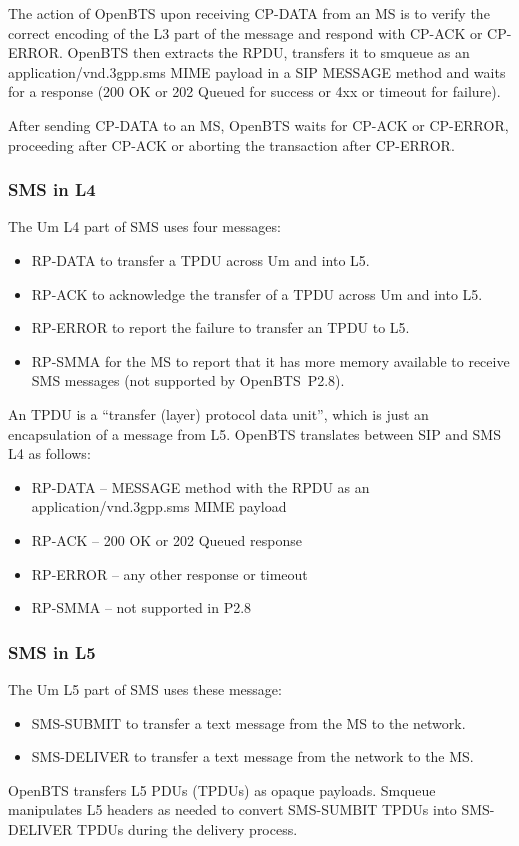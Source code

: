 \documentclass[11pt,openany]{book}
\begin{document}
The action of OpenBTS upon receiving CP-DATA from an MS is to verify the correct encoding of the L3 part of the message and respond with CP-ACK or CP-ERROR.
OpenBTS then extracts the RPDU, transfers it to smqueue as an application/vnd.3gpp.sms MIME payload in a SIP MESSAGE method and waits for a response (200 OK or 202 Queued for success or 4xx or timeout for failure).

After sending CP-DATA to an MS, OpenBTS waits for CP-ACK or CP-ERROR, proceeding after CP-ACK or aborting the transaction after CP-ERROR.

\subsubsection{SMS in L4}
The Um L4 part of SMS uses four messages:
\begin{itemize}
	\item RP-DATA to transfer a TPDU across Um and into L5.
	\item RP-ACK to acknowledge the transfer of a TPDU across Um and into L5.
	\item RP-ERROR to report the failure to transfer an TPDU to L5.
	\item RP-SMMA for the MS to report that it has more memory available to receive SMS messages (not supported by OpenBTS~P2.8).
\end{itemize}
An TPDU is a ``transfer (layer) protocol data unit'', which is just an encapsulation of a message from L5.
OpenBTS translates between SIP and SMS L4 as follows:
\begin{itemize}
	\item RP-DATA -- MESSAGE method with the RPDU as an application/vnd.3gpp.sms MIME payload
	\item RP-ACK -- 200 OK or 202 Queued response
	\item RP-ERROR -- any other response or timeout
	\item RP-SMMA -- not supported in P2.8
\end{itemize}

\subsubsection{SMS in L5}
The Um L5 part of SMS uses these message:
\begin{itemize}
	\item SMS-SUBMIT to transfer a text message from the MS to the network.
	\item SMS-DELIVER to transfer a text message from the network to the MS.
\end{itemize}
OpenBTS transfers L5 PDUs (TPDUs) as opaque payloads. Smqueue manipulates L5 headers as needed to convert SMS-SUMBIT TPDUs into SMS-DELIVER TPDUs during the delivery process.
\end{document}
